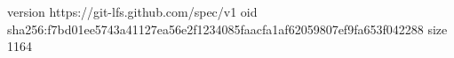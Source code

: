version https://git-lfs.github.com/spec/v1
oid sha256:f7bd01ee5743a41127ea56e2f1234085faacfa1af62059807ef9fa653f042288
size 1164
